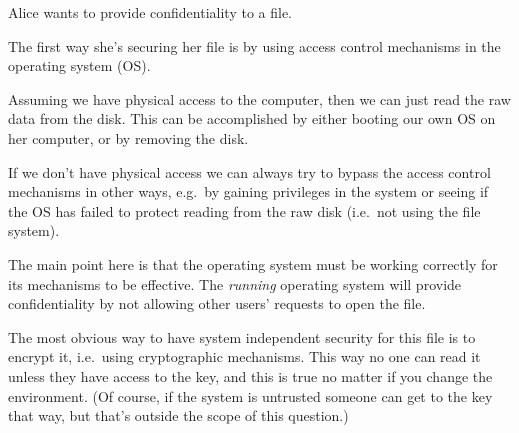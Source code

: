 \question
  Alice wants to provide confidentiality to a file.

  \begin{solution}
    The first way she's securing her file is by using access control mechanisms 
    in the operating system (OS).

    Assuming we have physical access to the computer, then we can just read the 
    raw data from the disk.
    This can be accomplished by either booting our own OS on her computer, or 
    by removing the disk.

    If we don't have physical access we can always try to bypass the access 
    control mechanisms in other ways, e.g.\ by gaining privileges in the system 
    or seeing if the OS has failed to protect reading from the raw disk (i.e.\ 
    not using the file system).

    The main point here is that the operating system must be working correctly 
    for its mechanisms to be effective.
    The \emph{running} operating system will provide confidentiality by not 
    allowing other users' requests to open the file.

    The most obvious way to have system independent security for this file is 
    to encrypt it, i.e.~using cryptographic mechanisms.
    This way no one can read it unless they have access to the key, and this is 
    true no matter if you change the environment.
    (Of course, if the system is untrusted someone can get to the key that way, 
    but that's outside the scope of this question.)
  \end{solution}


